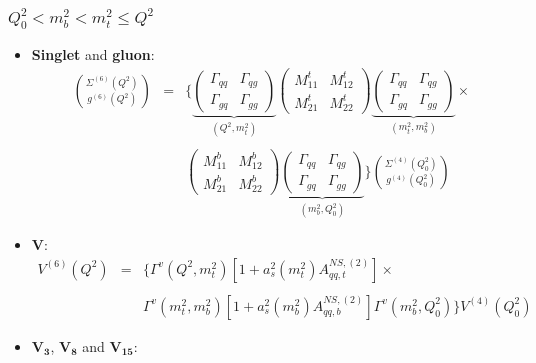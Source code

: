 \documentclass[10pt,a4paper]{article}
\begin{document}
\subsubsection{$Q_0^2<m_b^2<m_t^2\leq Q^2$}

\begin{itemize}
\item \textbf{Singlet} and \textbf{gluon}:
\begin{equation}
\begin{array}{rcl}
\displaystyle {\Sigma^{(6)}(Q^2) \choose g^{(6)}(Q^2)} &=& \displaystyle \Bigg\{\underbrace{\begin{pmatrix} \Gamma_{qq} & \Gamma_{qg} \\ \Gamma_{gq}& \Gamma_{gg}\end{pmatrix}}_{(Q^2,m_t^2)}\begin{pmatrix} M_{11}^t & M_{12}^t \\ M_{21}^t & M_{22}^t\end{pmatrix}\underbrace{\begin{pmatrix} \Gamma_{qq}& \Gamma_{qg} \\ \Gamma_{gq}& \Gamma_{gg}\end{pmatrix}}_{(m_t^2,m_b^2)}\times\\
\\
 & &\displaystyle\begin{pmatrix} M_{11}^b & M_{12}^b \\ M_{21}^b & M_{22}^b\end{pmatrix}\underbrace{\begin{pmatrix} \Gamma_{qq}& \Gamma_{qg} \\ \Gamma_{gq}& \Gamma_{gg}\end{pmatrix}}_{(m_b^2,Q_0^2)}\Bigg\}{\Sigma^{(4)}(Q_0^2) \choose g^{(4)}(Q_0^2)}
\end{array}
\end{equation}
\item $\mathbf{V}$:
\begin{equation}
\begin{array}{rcl}
V^{(6)}(Q^2)&=&\displaystyle \Big\{\Gamma^{v}(Q^2,m_t^2)[1+a_s^2(m_t^2)A_{qq,t}^{N\!S,(2)}]\times\\
\\
 & &\displaystyle \Gamma^{v}(m_t^2,m_b^2)[1+a_s^2(m_b^2)A_{qq,b}^{N\!S,(2)}]\Gamma^{v}(m_b^2,Q_0^2)\Big\}V^{(4)}(Q^2_0)
\end{array}
\end{equation}
\item $\mathbf{V_3}$, $\mathbf{V_8}$ and $\mathbf{V_{15}}$:

\end{itemize}
\end{document}

